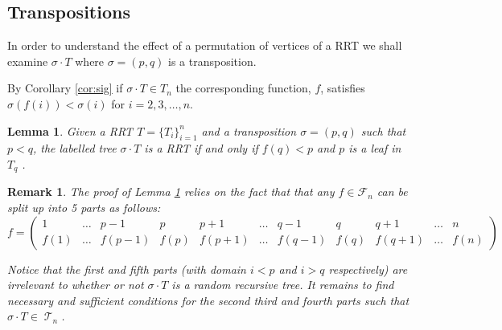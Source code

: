 \documentclass[10pt]{amsart} %
\newtheorem{remk}{Remark}
\newtheorem{lem}[thm]{Lemma}
\theoremstyle{definition}
\DeclareMathOperator{\T}{\mathcal{T}}
\begin{document}
\subsection{Transpositions}
In order to understand the effect of a permutation of vertices of a RRT we shall examine $\sigma \cdot T$ where $\sigma = (p,q)$ is a transposition.

By Corollary \ref{cor:sig} if $\sigma \cdot T \in T_n$ the corresponding function, $f$, satisfies $\sigma(f(i)) < \sigma(i)$ for $i = 2,3,\dots,n$.  

\begin{lem}\label{lem:rrtperm}
Given a RRT $T = \{T_{i}\}_{i=1}^{n}$ and a transposition $\sigma  = (p,q)$ such that $p <q$, the labelled tree $\sigma  \cdot T$ is a RRT if and only if $f(q)< p$ and $p$ is a leaf in $T_q$ .   
\end{lem}
\begin{remk}\label{remk:split}
The proof of  Lemma \ref{lem:rrtperm} relies on the fact that that any  $f \in \mathcal{F}_n$  can be split up into 5 parts as follows:
 \[ f = \left(\begin{array}{ccc|c|ccc|c|ccc}
     1    & \dots & p-1    &   p  & p+1    & \dots & q-1    & q    & q+1    & \dots & n \\
     f(1) & \dots & f(p-1) & f(p) & f(p+1) & \dots & f(q-1) & f(q) & f(q+1) & \dots & f(n)
    \end{array} \right)
\]

Notice that the first and fifth parts (with domain $i < p$ and $i > q$ respectively) are irrelevant to whether or not $\sigma \cdot T$ is a random recursive tree.  It remains to find necessary and sufficient conditions for the second third and fourth parts such that $\sigma \cdot T \in \T_n$.   

\end{remk}
\end{document}
